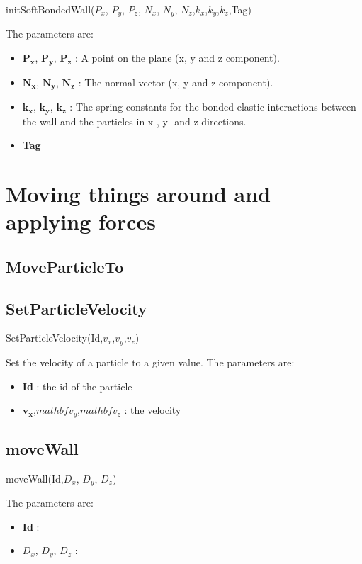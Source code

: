 \documentclass{report}
\begin{document}
\textsf{initSoftBondedWall($P_x$, $P_y$, $P_z$, $N_x$, $N_y$, $N_z$,$k_x$,$k_y$,$k_z$,Tag)}
\par\medskip
The parameters are:
\begin{itemize}
\item $\mathbf{P_x}$, $\mathbf{P_y}$, $\mathbf{P_z}$ : A point on the plane (x, y and z component).
\item $\mathbf{N_x}$, $\mathbf{N_y}$, $\mathbf{N_z}$ : The normal vector (x, y and z component).
\item $\mathbf{k_x}$, $\mathbf{k_y}$, $\mathbf{k_z}$ : The spring constants for the bonded elastic interactions between the wall and the particles in x-, y- and z-directions.
\item \textbf{Tag}
\end{itemize}


\section{Moving things around and applying forces}

\subsection{MoveParticleTo}


\subsection{SetParticleVelocity} 

\textsf{SetParticleVelocity(Id,$v_x$,$v_y$,$v_z$)}
\par\medskip

Set the velocity of a particle to a given value.
The parameters are:
\begin{itemize}
\item \textbf{Id} : the id of the particle
\item $\mathbf{v_x}$,$mathbf{v_y}$,$mathbf{v_z}$ : the velocity
\end{itemize}
 
\subsection{moveWall}

\textsf{moveWall(Id,$D_x$, $D_y$, $D_z$)}
\par\medskip

The parameters are:

\begin{itemize}
\item \textbf{Id} :
\item $D_x$, $D_y$, $D_z$ :
\end{itemize}
\end{document}
